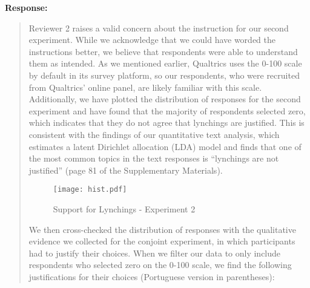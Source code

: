 \documentclass[a4paper,12pt]{article}
\begin{document}
\noindent \textbf{Response:} 
\begin{quote}

Reviewer 2 raises a valid concern about the instruction for our second
experiment. While we acknowledge that we could have worded the instructions
better, we believe that respondents were able to understand them as intended.
As we mentioned earlier, Qualtrics uses the 0-100 scale by default in its
survey platform, so our respondents, who were recruited from Qualtrics' online
panel, are likely familiar with this scale. Additionally, we have plotted the
distribution of responses for the second experiment and have found that the
majority of respondents selected zero, which indicates that they do not agree
that lynchings are justified. This is consistent with the findings of our
quantitative text analysis, which estimates a latent Dirichlet allocation (LDA)
model and finds that one of the most common topics in the text responses is
``lynchings are not justified'' (page 81 of the Supplementary Materials).

\begin{figure}
  \centering
  \texttt{[image: hist.pdf]}
  \caption{Support for Lynchings - Experiment 2}
  \label{fig:hist}
\end{figure}

We then cross-checked the distribution of responses with the qualitative
evidence we collected for the conjoint experiment, in which participants had to
justify their choices. When we filter our data to only include respondents who
selected zero on the 0-100 scale, we find the following justifications for
their choices (Portuguese version in parentheses): 

\begin{itemize}


\end{itemize}
\end{quote}
\end{document}
